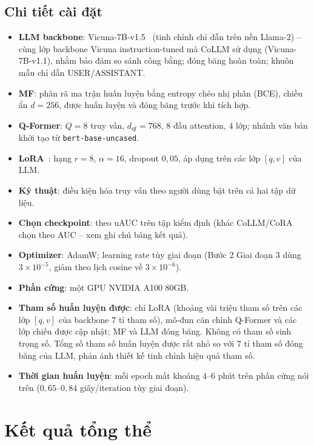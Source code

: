 \subsection{Chi tiết cài đặt}
\label{ssec:cai-dat}

\begin{itemize}
    \item \textbf{LLM backbone}: Vicuna-7B-v1.5~\cite{vicuna2023} (tinh chỉnh chỉ dẫn trên
    nền Llama-2) -- cùng lớp backbone Vicuna instruction-tuned mà CoLLM sử dụng
    (Vicuna-7B-v1.1), nhằm bảo đảm so sánh công bằng; đóng băng hoàn toàn; khuôn mẫu chỉ
    dẫn USER/ASSISTANT.
    \item \textbf{MF}: phân rã ma trận huấn luyện bằng entropy chéo nhị phân (BCE), chiều ẩn $d = 256$, được huấn
    luyện và đóng băng trước khi tích hợp.
    \item \textbf{Q-Former}: $Q = 8$ truy vấn, $d_{\text{qf}} = 768$, $8$ đầu attention,
    $4$ lớp; nhánh văn bản khởi tạo từ \texttt{bert-base-uncased}.
    \item \textbf{LoRA}~\cite{lora2021}: hạng $r = 8$, $\alpha = 16$, dropout $0{,}05$, áp
    dụng trên các lớp $[q,v]$ của LLM.
    \item \textbf{Kỹ thuật}: điều kiện hóa truy vấn theo người dùng bật trên cả hai tập dữ
    liệu.
    \item \textbf{Chọn checkpoint}: theo uAUC trên tập kiểm định (khác CoLLM/CoRA chọn theo
    AUC -- xem ghi chú bảng kết quả).
    \item \textbf{Optimizer}: AdamW; learning rate tùy giai đoạn (Bước 2 Giai đoạn 3 dùng
    $3\times10^{-5}$, giảm theo lịch cosine về $3\times10^{-6}$).
    \item \textbf{Phần cứng}: một GPU NVIDIA A100 80GB.
    \item \textbf{Tham số huấn luyện được}: chỉ LoRA (khoảng vài triệu tham số trên các lớp
    $[q,v]$ của backbone $7$ tỉ tham số), mô-đun căn chỉnh Q-Former và các lớp chiếu được cập nhật;
    MF và LLM đóng băng. Không có tham số sinh trọng số. Tổng số tham số huấn luyện được rất
    nhỏ so với $7$ tỉ tham số đóng băng của LLM, phản ánh thiết kế tinh chỉnh hiệu quả tham số.
    \item \textbf{Thời gian huấn luyện}: mỗi epoch mất khoảng $4$--$6$ phút trên phần cứng
    nói trên ($0{,}65$--$0{,}84$ giây/iteration tùy giai đoạn).
\end{itemize}

\section{Kết quả tổng thể}
\label{sec:ket-qua-chinh}

